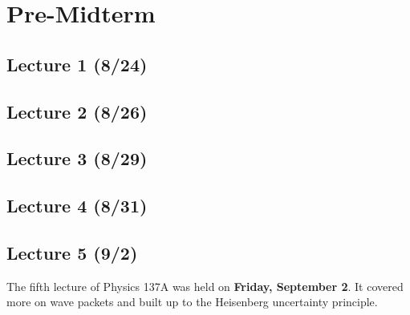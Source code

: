 \documentclass{book}
\theoremstyle{plain}
\begin{document}
  \part{Pre-Midterm}
    \chapter{Lecture 1 (8/24)}
    
    \chapter{Lecture 2 (8/26)}
    
    \chapter{Lecture 3 (8/29)}
    
    \chapter{Lecture 4 (8/31)}
    
            \chapter{Lecture 5 (9/2)}
              The fifth lecture of Physics 137A was held on \textbf{Friday, September 2}. It covered more on wave packets and built up to the Heisenberg uncertainty principle.
\end{document}
